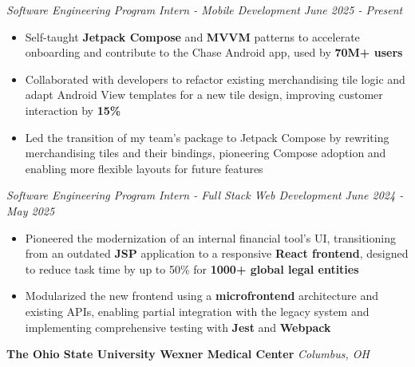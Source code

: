 \documentclass[letterpaper]{article}
\newenvironment{tightitemize}{%
  \begin{itemize}\small\setlength{\baselineskip}{0.95\baselineskip}\itemsep -1mm%
}{\end{itemize}}
\begin{document}
    \textit{Software Engineering Program Intern - Mobile Development} \hfill \textsl{June 2025 - Present}\\
    \vspace{-7pt}
    \begin{tightitemize} \itemsep -1mm

            \item Self-taught \textbf{Jetpack Compose} and \textbf{MVVM} patterns to accelerate onboarding and contribute to the Chase Android app, used by \textbf{70M+ users}
            
            \item Collaborated with developers to refactor existing merchandising tile logic and adapt Android View templates for a new tile design, improving customer interaction by \textbf{15\%}
            
            \item Led the transition of my team's package to Jetpack Compose by rewriting merchandising tiles and their bindings, pioneering Compose adoption and enabling more flexible layouts for future features
                    
    \end{tightitemize}
    \textit{Software Engineering Program Intern - Full Stack Web Development} \hfill \textsl{June 2024 - May 2025}\\
    \vspace{-7pt}
    \begin{tightitemize} \itemsep -1mm

            \item Pioneered the modernization of an internal financial tool's UI, transitioning from an outdated \textbf{JSP} application to a responsive \textbf{React frontend}, designed to reduce task time by up to 50\% for \textbf{1000+ global legal entities}

            \item Modularized the new frontend using a \textbf{microfrontend} architecture and existing APIs, enabling partial integration with the legacy system and implementing comprehensive testing with \textbf{Jest} and \textbf{Webpack}
                    
    \end{tightitemize}
    \vspace{-2mm}

    \textbf{The Ohio State University Wexner Medical Center} \hfill \textsl{Columbus, OH}\\
    
\end{document}
